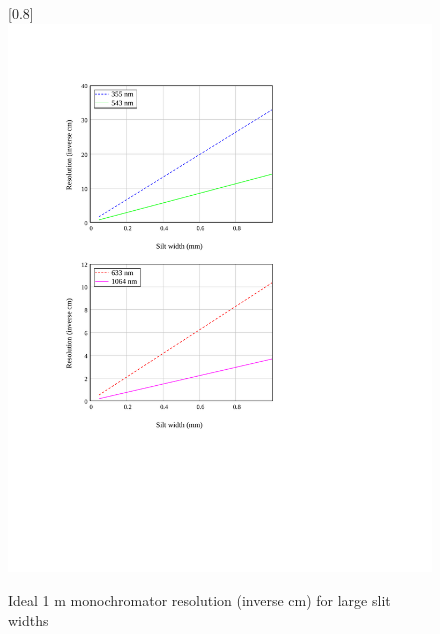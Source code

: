 \begin{figure}
\scalebox{0.8}[0.8]{
\includegraphics[bb=-30 212 489 700]
{far_cm/far_cm.pdf}
}
\caption{Ideal 1 m monochromator resolution (inverse cm) for large slit widths}
\label{far_cm}
\end{figure}
